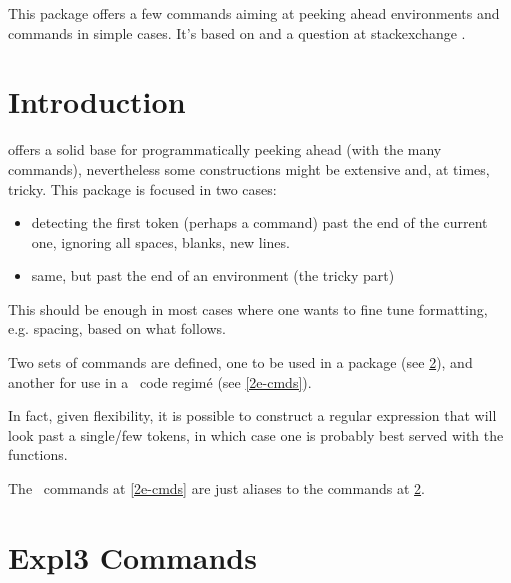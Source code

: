 \documentclass[10pt]{article}
\begin{document}
  

\begin{typesetabstract}
 
This package offers a few commands aiming at peeking ahead environments and commands in simple cases. It's based on  and a question at stackexchange \cite{stackexchange}.
\end{typesetabstract}

\tableofcontents

\section{Introduction}

 offers a solid base for programmatically peeking ahead (with the many \tsobj{\peek_} commands), nevertheless some constructions might be extensive and, at times, tricky. This package is focused in two cases:
\begin{itemize}
  \item detecting the first token (perhaps a command) past the end of the current one, ignoring all spaces, blanks, new lines.
  \item same, but past the end of an environment (the tricky part)
\end{itemize}
This should be enough in most cases where one wants to fine tune formatting, e.g. spacing, based on what follows. 

Two sets of commands are defined, one to be used in a  package (see \ref{expl3-cmds}), and another for use in a \LaTeXe\ code regimé (see \ref{2e-cmds}).
\begin{tsremark}
  In fact, given  flexibility, it is possible to construct a regular expression that will look past a single/few tokens, in which case one is probably best served with the  \tsobj{\peek_} functions.
\end{tsremark}
\begin{tsremark}
  The \LaTeXe\ commands at \ref{2e-cmds} are just aliases to the  commands at \ref{expl3-cmds}.
\end{tsremark}

\newpage

\section{Expl3 Commands}\label{expl3-cmds}
\end{document}
